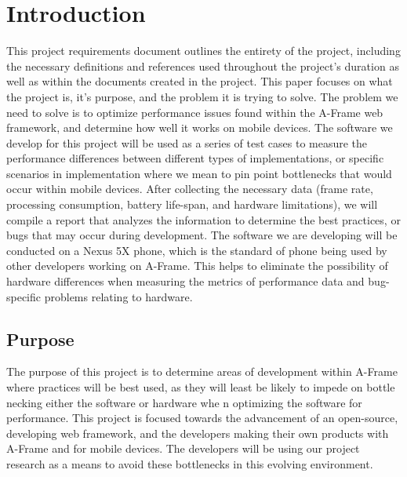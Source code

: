 \documentclass[letterpaper,10pt,titlepage,draftclsnofoot,onecolumn,compsoc,utf8,latin1]{IEEEtran}
\begin{document}
\section{Introduction}
\begin{singlespace}
\noindent
This project requirements document outlines the entirety of the project, including the necessary definitions and references used throughout the project's duration as well as within the documents created in the project. This paper focuses on what the project is, it's purpose, and the problem it is trying to solve. The problem we need to solve is to optimize performance issues found within the A-Frame web framework, and determine how well it works on mobile devices. The software we develop for this project will be used as a series of test cases to measure the performance differences between different types of implementations, or specific scenarios in implementation where we mean to pin point bottlenecks that would occur within mobile devices. After collecting the necessary data (frame rate, processing consumption, battery life-span, and hardware limitations), we will compile a report that analyzes the information to determine the best practices, or bugs that may occur during development. The software we are developing will be conducted on a Nexus 5X phone, which is the standard of phone being used by other developers working on A-Frame. This helps to eliminate the possibility of hardware differences when measuring the metrics of performance data and bug-specific problems relating to hardware.
\end{singlespace}

\subsection{Purpose}
\begin{singlespace}
\noindent
The purpose of this project is to determine areas of development within A-Frame where practices will be best used, as they will least be likely to impede on bottle necking either the software or hardware whe n optimizing the software for performance. This project is focused towards the advancement of an open-source, developing web framework, and the developers making their own products with A-Frame and for mobile devices. The developers will be using our project research as a means to avoid these bottlenecks in this evolving environment.
\end{singlespace}
\end{document}
